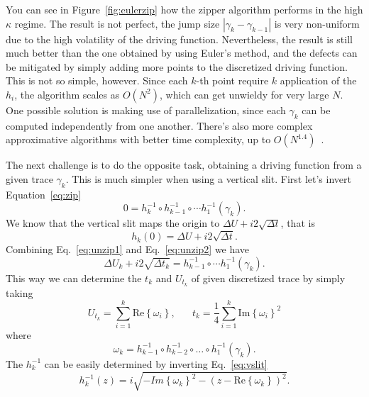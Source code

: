 You can see in Figure~\ref{fig:eulerzip} how the zipper algorithm performs in
the high $\kappa$ regime. The result is not perfect, the jump size
$\left|\gamma_{k}-\gamma_{k-1}\right|$ is very non-uniform due to the high
volatility of the driving function. Nevertheless, the result is still much
better than the one obtained by using Euler's method, and the defects can be
mitigated by simply adding more points to the discretized driving function.
This is not so simple, however. Since each $k$-th point require $k$ application
of the $h_i$, the algorithm scales as $O(N^2)$, which can get unwieldy for very
large $N$. One possible solution is making use of parallelization, since each
$\gamma_k$ can be computed independently from one another. There's also more
complex approximative algorithms with better time complexity, up to
$O(N^{1.4})$~\cite{Kennedy2007}.

The next challenge is to do the opposite task, obtaining a driving function
from a given trace $\gamma_k$. This is much simpler when using a vertical slit.
First let's invert Equation~\ref{eq:zip}
\begin{equation}
    \label{eq:unzip1}
    0=h_{k}^{-1}\circ h_{k-1}^{-1}\circ\cdots h_{1}^{-1}\left(\gamma_{k}\right).
\end{equation}
We know that the vertical slit maps the origin to $\Delta U+i2\sqrt{\Delta t}$,
that is
\begin{equation}
    \label{eq:unzip2}
    h_{k}\left(0\right)=\Delta U+i2\sqrt{\Delta t}.
\end{equation}
Combining Eq.~\ref{eq:unzip1} and Eq.~\ref{eq:unzip2} we have    
\begin{equation}
    \Delta U_{k}+i2\sqrt{\Delta t_{k}}=
    h_{k-1}^{-1}\circ\cdots h_{1}^{-1}\left(\gamma_{k}\right).
\end{equation}
This way we can determine the $t_k$ and $U_{t_k}$ of given discretized
trace by simply taking
\begin{equation}
    U_{t_k}=\sum_{i=1}^{k}\mbox{Re}\left\{ \omega_{i}\right\},
    \,\,\,\,\,\,\,\,\,\,
    t_{k}=\frac{1}{4}\sum_{i=1}^{k}\mbox{Im}\left\{ \omega_{i}\right\} ^{2}
\end{equation}
where
\begin{equation}
    \omega_{k}=h_{k-1}^{-1}\circ h_{k-2}^{-1}\circ
        \ldots\circ h_{1}^{-1}\left(\gamma_{k}\right).
\end{equation}
The $h_k^{-1}$ can be easily determined by inverting Eq.~\ref{eq:vslit}
\begin{equation}
    h_{k}^{-1}\left(z\right)=
    i\sqrt{-Im{\left\{ \omega_{k}\right\}}^{2}
           -{\left(z-\mbox{Re}\left\{ \omega_{k}\right\} \right)}^{2}}.
\end{equation}

